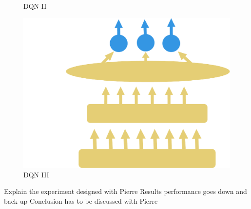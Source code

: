 \begin{figure}[ht]
\begin{minipage}[b]{0.4\linewidth}
\caption{DQN II}
\label{fig:net2}
\end{minipage}
\hspace{0.5cm}
\begin{minipage}[b]{0.4\linewidth}
\centering
\includegraphics[width=\textwidth]{./Images/Chapter08/fine_tuned_network.pdf}
\caption{DQN III}
\label{fig:net3}
\end{minipage}
\end{figure}







Explain the experiment designed with Pierre
 Results performance goes down and back up
 Conclusion has to be discussed with Pierre



